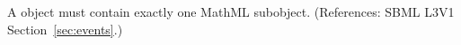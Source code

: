 A \Delay object must contain exactly one MathML 
subobject. (References: SBML L3V1 Section~\ref{sec:events}.)

